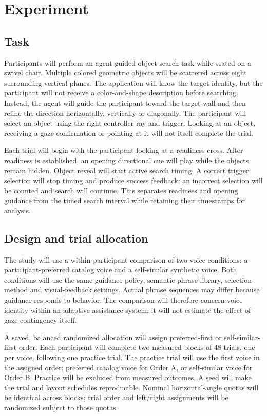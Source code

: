 \documentclass[11pt,letterpaper]{article}
\begin{document}
\setcounter{section}{3}
\section{Experiment}
\subsection{Task}
Participants will perform an agent-guided object-search task while seated on a swivel chair. Multiple colored geometric objects will be scattered across eight surrounding vertical planes. The application will know the target identity, but the participant will not receive a color-and-shape description before searching. Instead, the agent will guide the participant toward the target wall and then refine the direction horizontally, vertically or diagonally. The participant will select an object using the right-controller ray and trigger. Looking at an object, receiving a gaze confirmation or pointing at it will not itself complete the trial.

Each trial will begin with the participant looking at a readiness cross. After readiness is established, an opening directional cue will play while the objects remain hidden. Object reveal will start active search timing. A correct trigger selection will stop timing and produce success feedback; an incorrect selection will be counted and search will continue. This separates readiness and opening guidance from the timed search interval while retaining their timestamps for analysis.

\subsection{Design and trial allocation}
The study will use a within-participant comparison of two voice conditions: a participant-preferred catalog voice and a self-similar synthetic voice. Both conditions will use the same guidance policy, semantic phrase library, selection method and visual-feedback settings. Actual phrase sequences may differ because guidance responds to behavior. The comparison will therefore concern voice identity within an adaptive assistance system; it will not estimate the effect of gaze contingency itself.

A saved, balanced randomized allocation will assign preferred-first or self-similar-first order. Each participant will complete two measured blocks of 48 trials, one per voice, following one practice trial. The practice trial will use the first voice in the assigned order: preferred catalog voice for Order A, or self-similar voice for Order B. Practice will be excluded from measured outcomes. A seed will make the trial and layout schedules reproducible. Nominal horizontal-angle quotas will be identical across blocks; trial order and left/right assignments will be randomized subject to those quotas.
\end{document}
